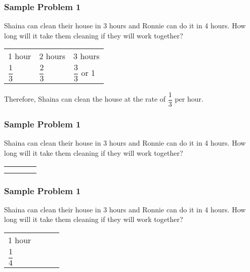\documentclass[14pt]{beamer}
\begin{document}
    \begin{frame}
    	\frametitle{Sample Problem 1}
    	Shaina can clean their house in 3 hours and Ronnie can do it in 4 hours. How long will it take them cleaning if they will work together?    	
    	
    	\vspace{1em}
    	\begin{tabularx}{\linewidth}{  g g g }
    		1 hour & 2 hours  & 3 hours \\
    		$ \dfrac{1}{3} $ & $ \dfrac{2}{3} $  & $ \dfrac{3}{3}  $ or 1 \\
    	\end{tabularx}
    
    \pause \vspace{1em} Therefore, Shaina can clean the house at the rate of $ \dfrac{1}{3} $ per hour.
    \end{frame}

    \begin{frame}
    	\frametitle{Sample Problem 1}
    	Shaina can clean their house in 3 hours and Ronnie can do it in 4 hours. How long will it take them cleaning if they will work together?    	
    	
    	\vspace{1em}
    	\begin{tabularx}{\linewidth}{  e  e  e  e }
    		\phantom{1 hour} & \phantom{2 hours}  & \phantom{3 hours} & \phantom{4 hours} \\
    		 &   &  &  \\    
    	\end{tabularx}
    \end{frame}

    \begin{frame}
    	\frametitle{Sample Problem 1}
    	Shaina can clean their house in 3 hours and Ronnie can do it in 4 hours. How long will it take them cleaning if they will work together?    	
    	
    	\vspace{1em}
    	\begin{tabularx}{\linewidth}{ g  e  e  e }
    		1 hour & \phantom{2 hours}  & \phantom{3 hours} & \phantom{4 hours} \\
    		$ \dfrac{1}{4} $ &   &  &  \\    
    	\end{tabularx}
    \end{frame}
\end{document}
